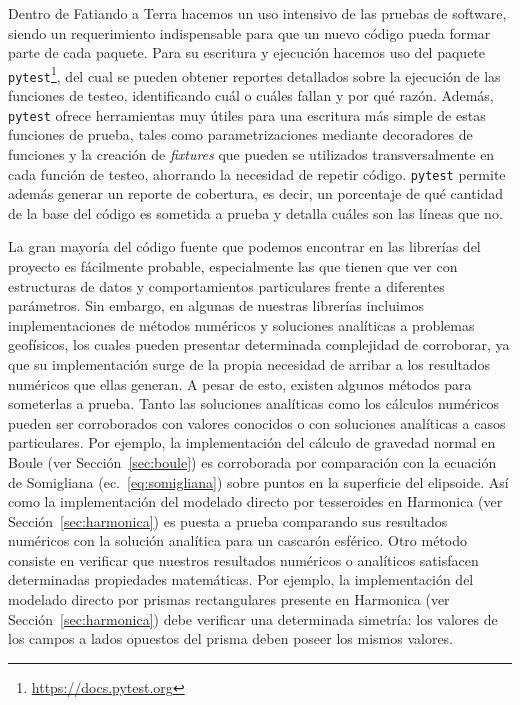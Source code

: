 Dentro de Fatiando a Terra hacemos un uso intensivo de las pruebas de software,
siendo un requerimiento indispensable para que un nuevo código pueda formar
parte de cada paquete.
Para su escritura y ejecución hacemos uso del paquete
\texttt{pytest}\footnote{\url{https://docs.pytest.org}}, del cual se pueden
obtener reportes detallados sobre la ejecución de las funciones de testeo,
identificando cuál o cuáles fallan y por qué razón.
Además, \texttt{pytest} ofrece herramientas muy útiles para una escritura más
simple de estas funciones de prueba, tales como parametrizaciones mediante
decoradores de funciones y la creación de \emph{fixtures} que pueden se
utilizados transversalmente en cada función de testeo, ahorrando la necesidad
de repetir código.
\texttt{pytest} permite además generar un reporte de cobertura, es decir, un
porcentaje de qué cantidad de la base del código es sometida a prueba y
detalla cuáles son las líneas que no.

La gran mayoría del código fuente que podemos encontrar en las librerías del
proyecto es fácilmente probable, especialmente las que tienen que ver con
estructuras de datos y comportamientos particulares frente a diferentes
parámetros.
Sin embargo, en algunas de nuestras librerías incluimos implementaciones de
métodos numéricos y soluciones analíticas a problemas geofísicos, los cuales
pueden presentar determinada complejidad de corroborar, ya que su
implementación surge de la propia necesidad de arribar a los resultados
numéricos que ellas generan.
A pesar de esto, existen algunos métodos para someterlas a prueba.
Tanto las soluciones analíticas como los cálculos numéricos pueden ser
corroborados con valores conocidos o con soluciones analíticas a casos
particulares.
Por ejemplo, la implementación del cálculo de gravedad normal en Boule (ver
Sección~\ref{sec:boule}) es corroborada por comparación con la ecuación de
Somigliana (ec.~\ref{eq:somigliana}) sobre puntos en la superficie del
elipsoide.
Así como la implementación del modelado directo por tesseroides en Harmonica
(ver Sección~\ref{sec:harmonica}) es puesta a prueba comparando sus resultados
numéricos con la solución analítica para un cascarón esférico.
Otro método consiste en verificar que nuestros resultados numéricos
o analíticos satisfacen determinadas propiedades matemáticas.
Por ejemplo, la implementación del modelado directo por prismas rectangulares
presente en Harmonica (ver Sección~\ref{sec:harmonica}) debe verificar una
determinada simetría: los valores de los campos a lados opuestos del prisma
deben poseer los mismos valores.

